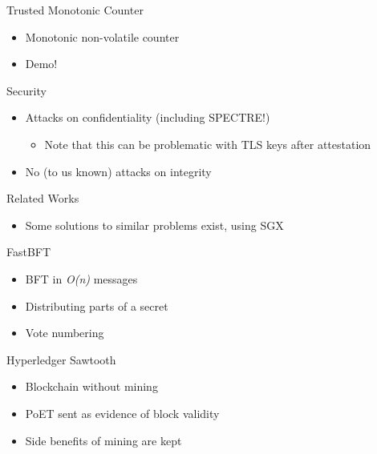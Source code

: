 \documentclass{beamer}
\begin{document}
	\begin{frame}{Trusted Monotonic Counter} %
		\begin{itemize}
			\item Monotonic non-volatile counter
			\item Demo!
		\end{itemize}
	\end{frame}

	\begin{frame}{Security}	%
		\begin{itemize}
			\item Attacks on confidentiality (including SPECTRE!)
			\begin{itemize}
				\item Note that this can be problematic with TLS keys after attestation
			\end{itemize}
			\item No (to us known) attacks on integrity
		\end{itemize}
	\end{frame}

	\begin{frame}{Related Works} %
		\begin{itemize}
			\item Some solutions to similar problems exist, using SGX
		\end{itemize}
	\end{frame}

	\begin{frame}{FastBFT} %
		\begin{itemize}
			\item BFT in \textit{O(n)} messages
			\item Distributing parts of a secret
			\item Vote numbering
		\end{itemize}
	\end{frame}

	\begin{frame}{Hyperledger Sawtooth}	%
		\begin{itemize}
			\item Blockchain without mining
			\item PoET sent as evidence of block validity
			\item Side benefits of mining are kept
		\end{itemize}
	\end{frame}
\end{document}

